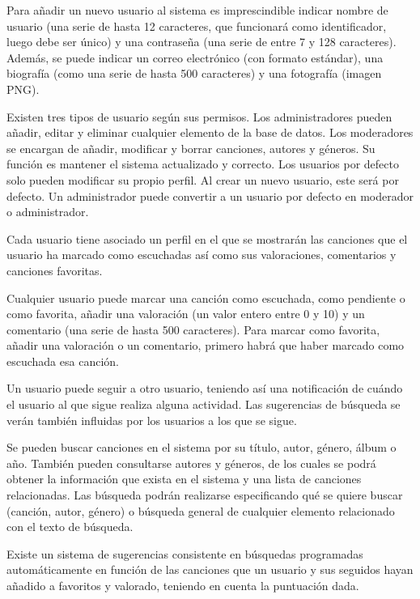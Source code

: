 \documentclass[
  12pt,
  a4paper,
  DIV=12,
  spanish,
]{scrartcl}
\begin{document}
Para añadir un nuevo usuario al sistema es imprescindible indicar nombre de usuario (una serie de hasta 12 caracteres, que funcionará como identificador, luego debe ser único) y una contraseña (una serie de entre 7 y 128 caracteres). Además, se puede indicar un correo electrónico (con formato estándar), una biografía (como una serie de hasta 500 caracteres) y una fotografía (imagen PNG).

Existen tres tipos de usuario según sus permisos. Los administradores pueden añadir, editar y eliminar cualquier elemento de la base de datos. Los moderadores se encargan de añadir, modificar y borrar canciones, autores y géneros. Su función es mantener el sistema actualizado y correcto. Los usuarios por defecto solo pueden modificar su propio perfil. Al crear un nuevo usuario, este será por defecto. Un administrador puede convertir a un usuario por defecto en moderador o administrador.

Cada usuario tiene asociado un perfil en el que se mostrarán las canciones que el usuario ha marcado como escuchadas así como sus valoraciones, comentarios y canciones favoritas.


Cualquier usuario puede marcar una canción como escuchada, como pendiente o como favorita, añadir una valoración (un valor entero entre 0 y 10) y un comentario (una serie de hasta 500 caracteres). Para marcar como favorita, añadir una valoración o un comentario, primero habrá que haber marcado como escuchada esa canción.

Un usuario puede seguir a otro usuario, teniendo así una notificación de cuándo el usuario al que sigue realiza alguna actividad. Las sugerencias de búsqueda se verán también influidas por los usuarios a los que se sigue.



Se pueden buscar canciones en el sistema por su título, autor, género, álbum o año. También pueden consultarse autores y géneros, de los cuales se podrá obtener la información que exista en el sistema y una lista de canciones relacionadas. Las búsqueda podrán realizarse especificando qué se quiere buscar (canción, autor, género) o búsqueda general de cualquier elemento relacionado con el texto de búsqueda.

Existe un sistema de sugerencias consistente en búsquedas programadas automáticamente en función de las canciones que un usuario y sus seguidos hayan añadido a favoritos y valorado, teniendo en cuenta la puntuación dada.
\end{document}
